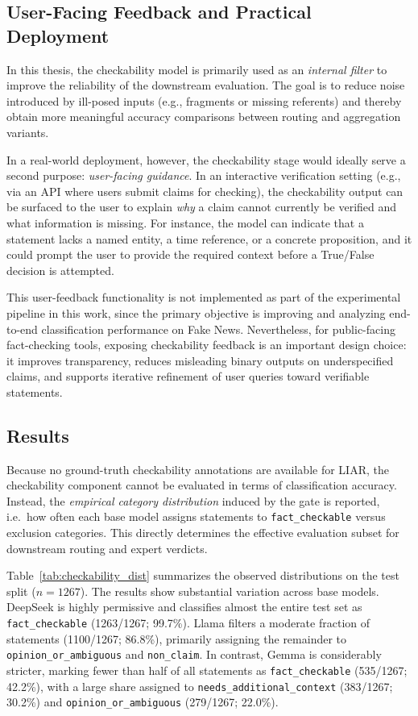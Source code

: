 \subsection{User-Facing Feedback and Practical Deployment}
In this thesis, the checkability model is primarily used as an \emph{internal filter} to improve the reliability of the downstream evaluation.
The goal is to reduce noise introduced by ill-posed inputs (e.g., fragments or missing referents) and thereby obtain more meaningful accuracy comparisons between routing and aggregation variants.

In a real-world deployment, however, the checkability stage would ideally serve a second purpose: \emph{user-facing guidance}.
In an interactive verification setting (e.g., via an API where users submit claims for checking), the checkability output can be surfaced to the user to explain \emph{why} a claim cannot currently be verified and what information is missing.
For instance, the model can indicate that a statement lacks a named entity, a time reference, or a concrete proposition, and it could prompt the user to provide the required context before a True/False decision is attempted.

This user-feedback functionality is not implemented as part of the experimental pipeline in this work, since the primary objective is improving and analyzing end-to-end classification performance on Fake News.
Nevertheless, for public-facing fact-checking tools, exposing checkability feedback is an important design choice: it improves transparency, reduces misleading binary outputs on underspecified claims, and supports iterative refinement of user queries toward verifiable statements.

\subsection{Results}

Because no ground-truth checkability annotations are available for LIAR, the checkability
component cannot be evaluated in terms of classification accuracy. Instead, the
\emph{empirical category distribution} induced by the gate is reported, i.e.\ how often each base model
assigns statements to \texttt{fact\_checkable} versus exclusion categories. This directly
determines the effective evaluation subset for downstream routing and expert verdicts.

Table~\ref{tab:checkability_dist} summarizes the observed distributions on the test split
($n=1267$). The results show substantial variation across base models. DeepSeek is highly
permissive and classifies almost the entire test set as \texttt{fact\_checkable}
(1263/1267; 99.7\%). Llama filters a moderate fraction of statements (1100/1267; 86.8\%),
primarily assigning the remainder to \texttt{opinion\_or\_ambiguous} and \texttt{non\_claim}.
In contrast, Gemma is considerably stricter, marking fewer than half of all statements as
\texttt{fact\_checkable} (535/1267; 42.2\%), with a large share assigned to
\texttt{needs\_additional\_context} (383/1267; 30.2\%) and \texttt{opinion\_or\_ambiguous}
(279/1267; 22.0\%).

